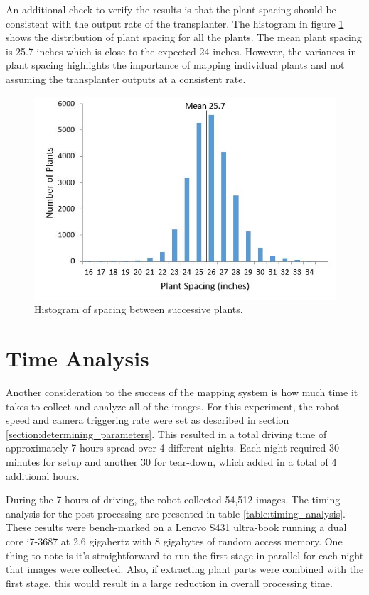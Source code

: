 An additional check to verify the results is that the plant spacing should be consistent with the output rate of the transplanter.  The histogram in figure \ref{figure:plant_spacing} shows the distribution of plant spacing for all the plants.  The mean plant spacing is 25.7 inches which is close to the expected 24 inches. However, the variances in plant spacing highlights the importance of mapping individual plants and not assuming the transplanter outputs at a consistent rate.

\begin{figure}
	\centering
    \includegraphics[width=5in]{figures/plant_spacing.jpg}
    \caption[Plant spacing histogram]{Histogram of spacing between successive plants.}
    \label{figure:plant_spacing}
\end{figure}

\section{Time Analysis}

Another consideration to the success of the mapping system is how much time it takes to collect and analyze all of the images. For this experiment, the robot speed and camera triggering rate were set as described in section \ref{section:determining_parameters}.  This resulted in a total driving time of approximately 7 hours spread over 4 different nights.  Each night required 30 minutes for setup and another 30 for tear-down, which added in a total of 4 additional hours.  

During the 7 hours of driving, the robot collected 54,512 images.  The timing analysis for the post-processing are presented in table \ref{table:timing_analysis}. These results were bench-marked on a Lenovo S431 ultra-book running a dual core i7-3687 at 2.6 gigahertz with 8 gigabytes of random access memory.  One thing to note is it's straightforward to run the first stage in parallel for each night that images were collected.  Also, if extracting plant parts were combined with the first stage, this would result in a large reduction in overall processing time. 

